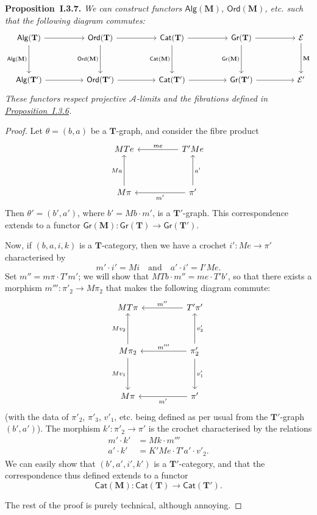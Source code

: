 \documentclass[fleqn]{article}
\newenvironment{itenv}[1]
  {\phantomsection\par\medskip\noindent\textbf{#1.}\itshape}
  {\par\medskip}
\newcommand{\oldpage}[1]{\marginpar{\footnotesize$\Big\vert$ \textit{p.~#1}}}
\newcommand{\TT}{\mathbf{T}}
\newcommand{\MM}{\mathbf{M}}
\newcommand{\textand}{\quad\text{and}\quad}
\newcommand{\cat}[1]{\mathcal{#1}}
\newcommand{\Cat}[1]{\mathsf{#1}}
\newcommand{\Gr}[1]{\Cat{Gr}(#1)}
\newcommand{\Alg}[1]{\Cat{Alg}(#1)}
\newcommand{\Ord}[1]{\Cat{Ord}(#1)}
\begin{document}
\oldpage{237}
\begin{itenv}{Proposition~I.3.7}
  We can construct functors $\Alg{\MM}$, $\Ord{\MM}$, etc. such that the following diagram commutes:
  \[
    \begin{tikzcd}[sep=huge]
      \Alg{\TT}
        \ar[d,swap,"\Alg{\MM}"]
        \ar[r]
    & \Ord{\TT}
        \ar[d,swap,"\Ord{\MM}"]
        \ar[r]
    & \Cat{Cat}(\TT)
        \ar[d,swap,"\Cat{Cat}(\MM)"]
        \ar[r]
    & \Gr{\TT}
        \ar[d,swap,"\Gr{\MM}"]
        \ar[r]
    & \cat{E}
        \ar[d,"\MM"]
    \\\Alg{\TT'}
        \ar[r]
    & \Ord{\TT'}
        \ar[r]
    & \Cat{Cat}(\TT')
        \ar[r]
    & \Gr{\TT'}
        \ar[r]
    & \cat{E'}
    \end{tikzcd}
  \]
  These functors respect projective $\cat{A}$-limits and the fibrations defined in \hyperref[proposition:I.3.6]{Proposition~I.3.6}.
\end{itenv}

\begin{proof}
  Let $\theta=(b,a)$ be a $\TT$-graph, and consider the fibre product
  \[
    \begin{tikzcd}[sep=huge]
      MTe
    & T'Me
        \ar[l,swap,"me"]
    \\M\pi
        \ar[u,"Ma"]
    & \pi'
        \ar[l,"m'"]
        \ar[u,swap,"a'"]
    \end{tikzcd}
  \]
  Then $\theta'=(b',a')$, where $b'=Mb\cdot m'$, is a $\TT'$-graph.
  This correspondence extends to a functor $\Gr{\MM}\colon\Gr{\TT}\to\Gr{\TT'}$.

  Now, if $(b,a,i,k)$ is a $\TT$-category, then we have a crochet $i'\colon Me\to\pi'$ characterised by
  \[
    m'\cdot i' = Mi
    \textand
    a'\cdot i' = I'Me.
  \]
  Set $m''=m\pi\cdot T'm'$;
  we will show that $MTb\cdot m''=me\cdot T'b'$, so that there exists a morphism $m'''\colon\pi'_2\to M\pi_2$ that makes the following diagram commute:
  \[
    \begin{tikzcd}[sep=huge]
      MT\pi
    & T'\pi'
        \ar[l,swap,"m''"]
    \\M\pi_2
        \ar[u,"Mv_2"]
        \ar[d,swap,"Mv_1"]
    & \pi'_2
        \ar[u,swap,"v'_2"]
        \ar[l,swap,"m'''"]
        \ar[d,"v'_1"]
    \\M\pi
    & \pi'
        \ar[l,"m'"]
    \end{tikzcd}
  \]
  (with the data of $\pi'_2$, $\pi'_3$, $v'_1$, etc. being defined as per usual from the $\TT'$-graph $(b',a')$).
  The morphism $k'\colon\pi'_2\to\pi'$ is the crochet characterised by the relations
  \[
    \begin{aligned}
      m'\cdot k'
    & = Mk\cdot m'''
    \\a'\cdot k'
    & = K'Me\cdot T'a'\cdot v'_2.
    \end{aligned}
  \]
  \oldpage{238}
  We can easily show that $(b',a',i',k')$ is a $\TT'$-category, and that the correspondence thus defined extends to a functor
  \[
    \Cat{Cat}(\MM)\colon \Cat{Cat}(\TT)\to\Cat{Cat}(\TT').
  \]

  The rest of the proof is purely technical, although annoying.
\end{proof}
\end{document}
